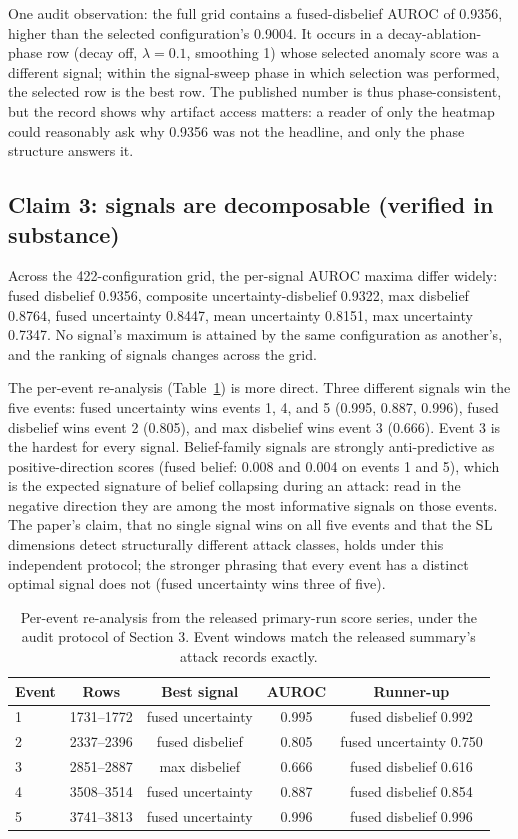 \documentclass[11pt]{article}
\begin{document}
One audit observation: the full grid contains a fused-disbelief AUROC of 0.9356, higher than the selected configuration's 0.9004. It occurs in a decay-ablation-phase row (decay off, $\lambda=0.1$, smoothing 1) whose selected anomaly score was a different signal; within the signal-sweep phase in which selection was performed, the selected row is the best row. The published number is thus phase-consistent, but the record shows why artifact access matters: a reader of only the heatmap could reasonably ask why 0.9356 was not the headline, and only the phase structure answers it.

\subsection{Claim 3: signals are decomposable (verified in substance)}

Across the 422-configuration grid, the per-signal AUROC maxima differ widely: fused disbelief 0.9356, composite uncertainty-disbelief 0.9322, max disbelief 0.8764, fused uncertainty 0.8447, mean uncertainty 0.8151, max uncertainty 0.7347. No signal's maximum is attained by the same configuration as another's, and the ranking of signals changes across the grid.

The per-event re-analysis (Table~\ref{tab:perevent}) is more direct. Three different signals win the five events: fused uncertainty wins events 1, 4, and 5 (0.995, 0.887, 0.996), fused disbelief wins event 2 (0.805), and max disbelief wins event 3 (0.666). Event 3 is the hardest for every signal. Belief-family signals are strongly anti-predictive as positive-direction scores (fused belief: 0.008 and 0.004 on events 1 and 5), which is the expected signature of belief collapsing during an attack: read in the negative direction they are among the most informative signals on those events. The paper's claim, that no single signal wins on all five events and that the SL dimensions detect structurally different attack classes, holds under this independent protocol; the stronger phrasing that every event has a distinct optimal signal does not (fused uncertainty wins three of five).

\begin{table}[t]
\centering
\small
\begin{tabular}{@{}lcccc@{}}
\toprule
Event & Rows & Best signal & AUROC & Runner-up \\
\midrule
1 & 1731--1772 & fused uncertainty & 0.995 & fused disbelief 0.992 \\
2 & 2337--2396 & fused disbelief & 0.805 & fused uncertainty 0.750 \\
3 & 2851--2887 & max disbelief & 0.666 & fused disbelief 0.616 \\
4 & 3508--3514 & fused uncertainty & 0.887 & fused disbelief 0.854 \\
5 & 3741--3813 & fused uncertainty & 0.996 & fused disbelief 0.996 \\
\bottomrule
\end{tabular}
\caption{Per-event re-analysis from the released primary-run score series, under the audit protocol of Section 3. Event windows match the released summary's attack records exactly.}
\label{tab:perevent}
\end{table}
\end{document}
